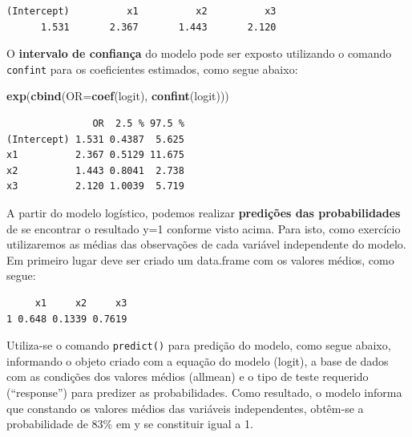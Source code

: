 \documentclass[12pt,brazil,oneside]{book}
\newenvironment{Shaded}{\begin{snugshade}}{\end{snugshade}}
\newcommand{\DataTypeTok}[1]{\textcolor[rgb]{0.13,0.29,0.53}{#1}}
\newcommand{\KeywordTok}[1]{\textcolor[rgb]{0.13,0.29,0.53}{\textbf{#1}}}
\newcommand{\NormalTok}[1]{#1}
\newcommand{\OperatorTok}[1]{\textcolor[rgb]{0.81,0.36,0.00}{\textbf{#1}}}
\newcommand{\StringTok}[1]{\textcolor[rgb]{0.31,0.60,0.02}{#1}}
\begin{document}
\begin{verbatim}
(Intercept)          x1          x2          x3 
      1.531       2.367       1.443       2.120 
\end{verbatim}

O \textbf{intervalo de confiança} do modelo pode ser exposto utilizando
o comando \texttt{confint} para os coeficientes estimados, como segue
abaixo:

\begin{Shaded}
\begin{Highlighting}[]
\KeywordTok{exp}\NormalTok{(}\KeywordTok{cbind}\NormalTok{(}\DataTypeTok{OR=}\KeywordTok{coef}\NormalTok{(logit), }\KeywordTok{confint}\NormalTok{(logit)))}
\end{Highlighting}
\end{Shaded}

\begin{verbatim}
               OR  2.5 % 97.5 %
(Intercept) 1.531 0.4387  5.625
x1          2.367 0.5129 11.675
x2          1.443 0.8041  2.738
x3          2.120 1.0039  5.719
\end{verbatim}

A partir do modelo logístico, podemos realizar \textbf{predições das
probabilidades} de se encontrar o resultado y=1 conforme visto acima.
Para isto, como exercício utilizaremos as médias das observações de cada
variável independente do modelo. Em primeiro lugar deve ser criado um
data.frame com os valores médios, como segue:

\begin{Shaded}
\end{Shaded}

\begin{verbatim}
     x1     x2     x3
1 0.648 0.1339 0.7619
\end{verbatim}

Utiliza-se o comando \texttt{predict()} para predição do modelo, como
segue abaixo, informando o objeto criado com a equação do modelo
(logit), a base de dados com as condições dos valores médios (allmean) e
o tipo de teste requerido (``response'') para predizer as
probabilidades. Como resultado, o modelo informa que constando os
valores médios das variáveis independentes, obtêm-se a probabilidade de
83\% em y se constituir igual a 1.
\end{document}
